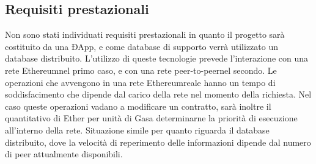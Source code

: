 \subsection{Requisiti prestazionali}
Non sono stati individuati requisiti prestazionali in quanto il progetto sarà costituito da una ÐApp\glo, e come database di supporto verrà utilizzato un database distribuito. L'utilizzo di queste tecnologie prevede l'interazione con una rete Ethereum\glosp nel primo caso, e con una rete peer-to-peer\glosp nel secondo. Le operazioni che avvengono in una rete Ethereum\glosp reale hanno un tempo di soddisfacimento che dipende dal carico della rete nel momento della richiesta. Nel caso queste operazioni vadano a modificare un contratto, sarà inoltre il quantitativo di Ether per unità di Gas\glosp a determinarne la priorità di esecuzione all'interno della rete. Situazione simile per quanto riguarda il database distribuito, dove la velocità di reperimento delle informazioni dipende dal numero di peer attualmente disponibili.